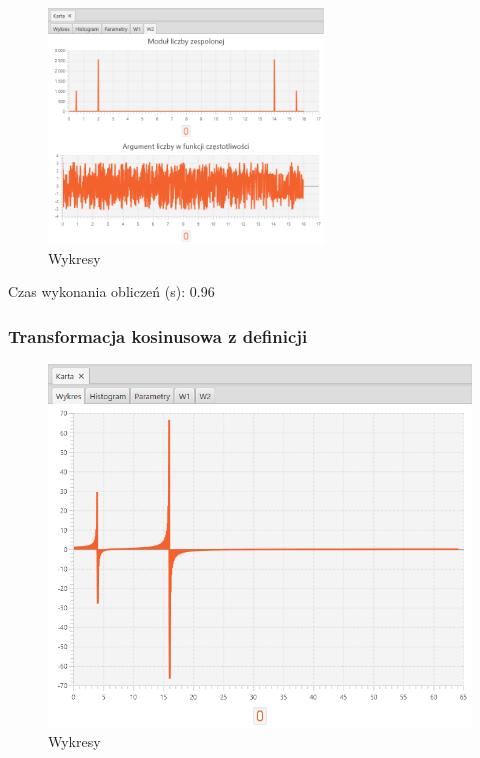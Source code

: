 \documentclass[12pt]{article}
\begin{document}
{{{                \begin{figure}[H]
                    \centering
                    \includegraphics[width=0.65\textwidth]{img/result/s1/03/W2_draw_3_sinus_sampling_trans_s1_data_205633.png}
                    \caption{Wykresy}
                \end{figure}

                Czas wykonania obliczeń (s): 0.96
            }
            \newpage

            \subsubsection{Transformacja kosinusowa z definicji} {

                \begin{figure}[H]
                    \centering
                    \includegraphics[width=\textwidth]{img/result/s1/04/data_draw_4_sinus_sampling_trans_s1_data_205648.png}
                    \caption{Wykresy}
                \end{figure}

}}}
\end{document}
